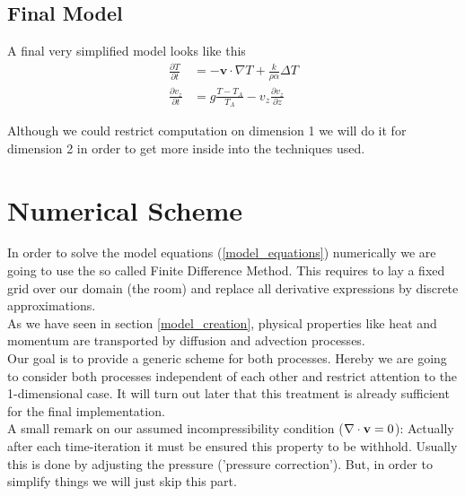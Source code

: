 \documentclass[]{article}
\begin{document}
\subsection{Final Model}

A final very simplified model looks like this
\begin{align} 
\frac{\partial T}{\partial t}&=-\textbf{v}\cdot \nabla T + \frac{k}{\rho\alpha}\Delta T \label{model_equations} \\
\frac{\partial v_{z}}{\partial t}&=g\frac{T-T_{A}}{T_{A}}-v_{z}\frac{\partial v_{z}}{\partial z} \nonumber
\end{align}

Although we could restrict computation on dimension 1 we will do it for dimension 2 in order to
get more inside into the techniques used.


\section{Numerical Scheme}
In order to solve the model equations (\ref{model_equations}) numerically we are going to use the so called Finite Difference Method. This requires to lay a fixed grid over our domain (the room) and replace all derivative expressions by discrete approximations.\\
As we have seen in section \ref{model_creation}, physical properties like
heat and momentum are transported by diffusion and advection processes.\\
Our goal is to provide a generic scheme for both processes.
Hereby we are going to consider both processes independent of each other and restrict
attention to the 1-dimensional case. It will turn out later that this treatment is already
sufficient for the final implementation.\\
A small remark on our assumed incompressibility condition ($\nabla\cdot\textbf v=0$): Actually after each time-iteration it must be ensured this property to be withhold. Usually this is done by adjusting the pressure ('pressure correction'). But, in order to simplify things we will just skip this part.
\end{document}
